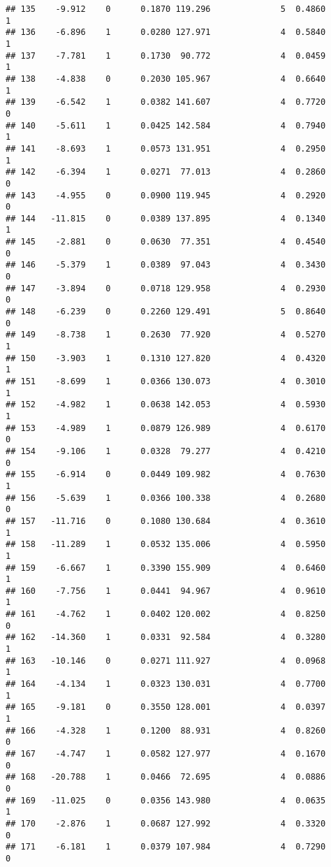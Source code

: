 \documentclass[
]{article}
\begin{document}
\begin{verbatim}
## 135    -9.912    0      0.1870 119.296              5  0.4860      1
## 136    -6.896    1      0.0280 127.971              4  0.5840      1
## 137    -7.781    1      0.1730  90.772              4  0.0459      1
## 138    -4.838    0      0.2030 105.967              4  0.6640      1
## 139    -6.542    1      0.0382 141.607              4  0.7720      0
## 140    -5.611    1      0.0425 142.584              4  0.7940      1
## 141    -8.693    1      0.0573 131.951              4  0.2950      1
## 142    -6.394    1      0.0271  77.013              4  0.2860      0
## 143    -4.955    0      0.0900 119.945              4  0.2920      0
## 144   -11.815    0      0.0389 137.895              4  0.1340      1
## 145    -2.881    0      0.0630  77.351              4  0.4540      0
## 146    -5.379    1      0.0389  97.043              4  0.3430      0
## 147    -3.894    0      0.0718 129.958              4  0.2930      0
## 148    -6.239    0      0.2260 129.491              5  0.8640      0
## 149    -8.738    1      0.2630  77.920              4  0.5270      1
## 150    -3.903    1      0.1310 127.820              4  0.4320      1
## 151    -8.699    1      0.0366 130.073              4  0.3010      1
## 152    -4.982    1      0.0638 142.053              4  0.5930      1
## 153    -4.989    1      0.0879 126.989              4  0.6170      0
## 154    -9.106    1      0.0328  79.277              4  0.4210      0
## 155    -6.914    0      0.0449 109.982              4  0.7630      1
## 156    -5.639    1      0.0366 100.338              4  0.2680      0
## 157   -11.716    0      0.1080 130.684              4  0.3610      1
## 158   -11.289    1      0.0532 135.006              4  0.5950      1
## 159    -6.667    1      0.3390 155.909              4  0.6460      1
## 160    -7.756    1      0.0441  94.967              4  0.9610      1
## 161    -4.762    1      0.0402 120.002              4  0.8250      0
## 162   -14.360    1      0.0331  92.584              4  0.3280      1
## 163   -10.146    0      0.0271 111.927              4  0.0968      1
## 164    -4.134    1      0.0323 130.031              4  0.7700      1
## 165    -9.181    0      0.3550 128.001              4  0.0397      1
## 166    -4.328    1      0.1200  88.931              4  0.8260      0
## 167    -4.747    1      0.0582 127.977              4  0.1670      0
## 168   -20.788    1      0.0466  72.695              4  0.0886      0
## 169   -11.025    0      0.0356 143.980              4  0.0635      1
## 170    -2.876    1      0.0687 127.992              4  0.3320      0
## 171    -6.181    1      0.0379 107.984              4  0.7290      0

\end{verbatim}
\end{document}
